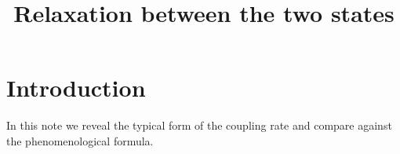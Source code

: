 \documentclass[aps,twocolumn,pra,notitlepage,]{revtex4-2}
\begin{document}

\title{Relaxation between the two states} 


\begin{abstract}
  
\end{abstract}
\maketitle

\section{Introduction}
In this note we reveal the typical form of the coupling rate and compare against the phenomenological formula.
\end{document}
